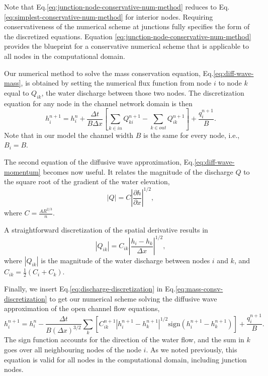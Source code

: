 \documentclass[bg, manuscript]{copernicus}
\begin{document}
Note that Eq.\eqref{eq:junction-node-conservative-num-method} reduces to Eq.\eqref{eq:simplest-conservative-num-method} for interior nodes.
Requiring conservativeness of the numerical scheme at junctions fully specifies the form of the discretized equations.   
Equation \eqref{eq:junction-node-conservative-num-method} provides the blueprint for a conservative numerical scheme  that is applicable to all nodes in the computational domain.

Our numerical method to solve the mass conservation equation, Eq.\eqref{eq:diff-wave-mass}, is obtained by setting the numerical flux function from node $i$ to node $k$ equal to $Q_{ik}$, the water discharge between those two nodes.
The discretization equation for any node in the channel network domain is then
\begin{equation} \label{eq:mass-consv-discretization}
h_i^{n+1} = h_i^{n} + \frac{\Delta t}{B\Delta x }\left[ \sum_{k\in in} Q_{ki}^{n+1} - \sum_{k \in out}Q_{ik}^{n+1}\right] + \frac{q_i^{n+1}}{B}.
\end{equation}
Note that in our model the channel width $B$ is the same for every node, i.e., $B_i = B$.

The second equation of the diffusive wave approximation, Eq.\eqref{eq:diff-wave-momentum}  becomes now useful.
It relates the magnitude of the discharge $Q$ to the square root of the gradient of the water elevation,
\begin{equation} \label{}
|Q| = C\left|\frac{\partial h}{\partial x}\right|^{1/2},
\end{equation}
where $C=\frac{A R^{2/3}}{n}$.

A straightforward discretization of the spatial derivative results in 
\begin{equation} \label{eq:discharge-discretization}
|Q_{ik}| = C_{ik}\left|\frac{h_i - h_k}{\Delta x}\right|^{1/2},
\end{equation}
where $|Q_{ik}|$ is the magnitude of the water discharge between nodes $i$ and $k$, and $C_{ik} = \frac{1}{2}\left(C_i + C_k\right)$.

Finally, we insert Eq.\eqref{eq:discharge-discretization} in Eq.\eqref{eq:mass-consv-discretization} to get our numerical scheme solving the diffusive wave approximation of the open channel flow equations,
\begin{equation} \label{eq:openchannelflow-final-discretization}
h_i^{n+1} = h_i^n - \frac{\Delta t}{B(\Delta x)^{3/2}}\sum_k\left[C_{ik}^{n+1}|h_i^{n+1} - h_k^{n+1}|^{1/2} \text{sign}(h_i^{n+1} - h_k^{n+1})\right] + \frac{q_i^{n+1}}{B}.
\end{equation}
The sign function accounts for the direction of the water flow, and the sum in $k$ goes over all neighbouring nodes of the node $i$. 
As we noted previously, this equation is valid for all nodes in the computational domain, including junction nodes.
\end{document}
